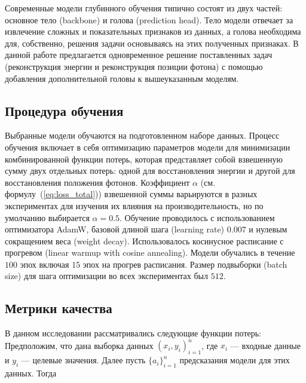 \documentclass[a4paper,12pt]{extarticle}
\begin{document}
Современные модели глубинного обучения типично состоят из двух частей: основное тело (backbone) и голова (prediction head). Тело модели отвечает за извлечение сложных и показательных признаков из данных, а голова необходима для, собственно, решения задачи основываясь на этих полученных признаках. В данной работе предлагается одновременное решение поставленных задач (реконструкция энергии и реконструкция позиции фотона) с помощью добавления дополнительной головы к вышеуказанным моделям.

\subsection{Процедура обучения}

Выбранные модели обучаются на подготовленном наборе данных. Процесс обучения включает в себя оптимизацию параметров модели для минимизации комбинированной функции потерь, которая представляет собой взвешенную сумму двух отдельных потерь: одной для восстановления энергии и другой для восстановления положения фотонов. Коэффициент $\alpha$ (см. формулу~(\ref{eq:loss_total})) взвешенной суммы варьируются в разных экспериментах для изучения их влияния на производительность, но по умолчанию выбирается $\alpha = 0.5$. Обучение проводилось с использованием оптимизатора AdamW, базовой длиной шага (learning rate) $0.007$ и нулевым сокращением веса (weight decay). Использовалось косинусное расписание с прогревом (linear warmup with cosine annealing). Модели обучались в течение $100$ эпох включая $15$ эпох на прогрев расписания. Размер подвыборки (batch size) для шага оптимизации во всех экспериментах был $512$.

\subsection{Метрики качества}
\label{subsection:metrics}

В данном исследовании рассматривались следующие функции потерь: Предположим, что дана выборка данных $(x_i, y_i)_{i = 1}^{n}$, где $x_i$ --- входные данные и $y_i$ --- целевые значения. Далее пусть $\{ a_i \}_{i = 1}^{n}$ предсказания модели для этих данных. Тогда
\end{document}
